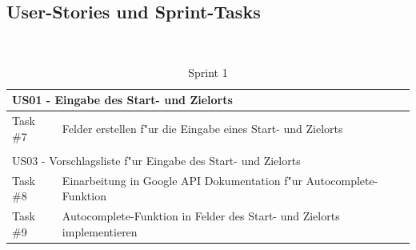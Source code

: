 \documentclass[a4paper, 11pt]{scrreprt}
\begin{document}
\subsection{User-Stories und Sprint-Tasks}

\begin{table}[H]

\caption{Sprint 1}

\ \\

\par

\label{tab:Sprint 1}

\centering

\begin{tabular}{|p{2.5cm} p{12cm}| ll}

\hline
\multicolumn{2}{|l|}{US01 - Eingabe des Start- und Zielorts}  \\

\hline
Task \#7 & Felder erstellen f"ur die Eingabe eines Start- und Zielorts\\

\hline
\multicolumn{2}{l}{}\\

\hline
\multicolumn{2}{|l|}{US03 - Vorschlagsliste f"ur Eingabe des Start- und Zielorts}\\

\hline
Task \#8 & Einarbeitung in Google API Dokumentation f"ur Autocomplete-Funktion\\

\hline
Task \#9 & Autocomplete-Funktion in Felder des Start- und Zielorts implementieren\\

\hline

\end{tabular}

\end{table}
\end{document}
